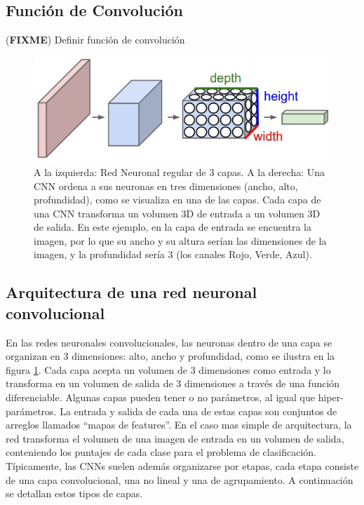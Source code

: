 \documentclass[a4paper,11pt,spanish]{book}
\newcommand*{\FIXME}[1]{{(\textbf{FIXME}) {#1}}}
\begin{document}
    \subsection{Función de Convolución}
      \FIXME{Definir función de convolución}
    \begin{figure}[H]
      \begin{center}
       \includegraphics[width=0.8\linewidth]{./img/stanford_cnn.jpeg}
      \end{center}
      \caption{A la izquierda: Red Neuronal regular de 3 capas. A la derecha: Una CNN ordena a sus neuronas en tres dimensiones (ancho, alto, profundidad), como se visualiza en una de
	las capas. Cada capa de una CNN transforma un volumen 3D de entrada a un volumen 3D de salida. En este ejemplo, en la capa de entrada se encuentra la imagen, por lo que su ancho y su altura
	serían las dimensiones de la imagen, y la profundidad sería 3 (los canales Rojo, Verde, Azul). \cite{Karpathy:Stanford}}
      \label{fig:cnn}
    \end{figure}

    \subsection {Arquitectura de una red neuronal convolucional}
      En las redes neuronales convolucionales, las neuronas dentro de una capa se organizan en 3 dimensiones: alto, ancho y profundidad, como se ilustra en la figura \ref{fig:cnn}.
      Cada capa acepta un volumen de 3 dimensiones como entrada y lo transforma en un volumen de salida de 3 dimensiones a través de una función diferenciable.
      Algunas capas pueden tener o no parámetros, al igual que hiper-parámetros. La entrada y salida de cada una de estas capas son conjuntos de arreglos llamados “mapas de features”.
      En el caso mas simple de arquitectura, la red transforma el volumen de una imagen de entrada en un volumen de salida, conteniendo los puntajes de cada clase para el problema de clasificación.
      Típicamente, las CNNs suelen además organizarse por etapas, cada etapa consiste de una capa convolucional, una no lineal y una de agrupamiento.
      A continuación se detallan estos tipos de capas.
\end{document}
